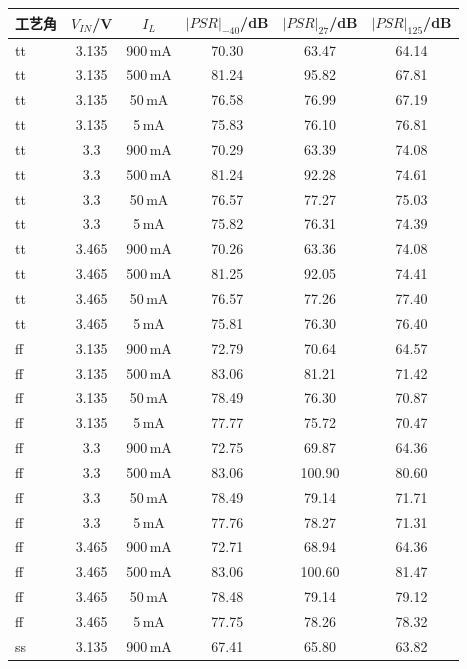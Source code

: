 \documentclass[a4paper, 12pt]{article}
\begin{document}
\begin{table}[H]
  \centering
  \scriptsize
  \setlength{\tabcolsep}{4pt}
  \begin{tabular}{lccccc}
    \toprule
    工艺角 & $V_{IN}$/V & $I_L$ & $|PSR|_{-40}$/dB & $|PSR|_{27}$/dB & $|PSR|_{125}$/dB \\
    \midrule
    tt & 3.135 & 900\,mA & 70.30 & 63.47 & 64.14 \\
    tt & 3.135 & 500\,mA & 81.24 & 95.82 & 67.81 \\
    tt & 3.135 & 50\,mA & 76.58 & 76.99 & 67.19 \\
    tt & 3.135 & 5\,mA & 75.83 & 76.10 & 76.81 \\
    tt & 3.3 & 900\,mA & 70.29 & 63.39 & 74.08 \\
    tt & 3.3 & 500\,mA & 81.24 & 92.28 & 74.61 \\
    tt & 3.3 & 50\,mA & 76.57 & 77.27 & 75.03 \\
    tt & 3.3 & 5\,mA & 75.82 & 76.31 & 74.39 \\
    tt & 3.465 & 900\,mA & 70.26 & 63.36 & 74.08 \\
    tt & 3.465 & 500\,mA & 81.25 & 92.05 & 74.41 \\
    tt & 3.465 & 50\,mA & 76.57 & 77.26 & 77.40 \\
    tt & 3.465 & 5\,mA & 75.81 & 76.30 & 76.40 \\
    \midrule
    ff & 3.135 & 900\,mA & 72.79 & 70.64 & 64.57 \\
    ff & 3.135 & 500\,mA & 83.06 & 81.21 & 71.42 \\
    ff & 3.135 & 50\,mA & 78.49 & 76.30 & 70.87 \\
    ff & 3.135 & 5\,mA & 77.77 & 75.72 & 70.47 \\
    ff & 3.3 & 900\,mA & 72.75 & 69.87 & 64.36 \\
    ff & 3.3 & 500\,mA & 83.06 & 100.90 & 80.60 \\
    ff & 3.3 & 50\,mA & 78.49 & 79.14 & 71.71 \\
    ff & 3.3 & 5\,mA & 77.76 & 78.27 & 71.31 \\
    ff & 3.465 & 900\,mA & 72.71 & 68.94 & 64.36 \\
    ff & 3.465 & 500\,mA & 83.06 & 100.60 & 81.47 \\
    ff & 3.465 & 50\,mA & 78.48 & 79.14 & 79.12 \\
    ff & 3.465 & 5\,mA & 77.75 & 78.26 & 78.32 \\
    \midrule
    ss & 3.135 & 900\,mA & 67.41 & 65.80 & 63.82 \\

\end{tabular}
\end{table}
\end{document}
